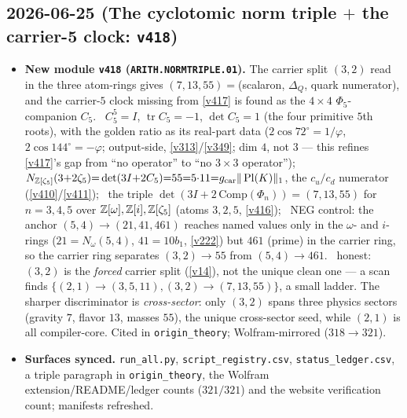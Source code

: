 \subsection*{2026-06-25 (The cyclotomic norm triple $+$ the carrier-5 clock: \texttt{v418})}
\begin{itemize}
\item \textbf{New module \texttt{v418} (\texttt{ARITH.NORMTRIPLE.01}).} The carrier split $(3,2)$ read in
the three atom-rings gives $(7,13,55)=$(scalaron, $\Delta_Q$, quark numerator), and the carrier-$5$ clock
missing from \vref{v417} is found as the $4{\times}4$ $\Phi_5$-companion $C_5$. \mE\ $C_5^5{=}I$,
$\operatorname{tr}C_5{=}{-}1$, $\det C_5{=}1$ (the four primitive $5$th roots), with the golden ratio as its
real-part data ($2\cos72^\circ{=}1/\varphi$, $2\cos144^\circ{=}{-}\varphi$; output-side, \vref{v313}/\vref{v349};
dim $4$, not $3$ --- this refines \vref{v417}'s gap from ``no operator'' to ``no $3{\times}3$ operator''); \mE\
$N_{\mathbb{Z}[\zeta_5]}(3{+}2\zeta_5){=}\det(3I{+}2C_5){=}55{=}5{\cdot}11{=}g_{\mathrm{car}}\|\operatorname{Pl}(K)\|_1$, the
$c_u/c_d$ numerator (\vref{v410}/\vref{v411}); \mE\ the triple $\det(3I{+}2\,\mathrm{Comp}(\Phi_n))=(7,13,55)$
for $n{=}3,4,5$ over $\mathbb{Z}[\omega],\mathbb{Z}[i],\mathbb{Z}[\zeta_5]$ (atoms $3,2,5$, \vref{v416}); \mE\ NEG control: the anchor
$(5,4)\to(21,41,461)$ reaches named values only in the $\omega$- and $i$-rings ($21{=}N_\omega(5,4)$,
$41{=}10b_1$, \vref{v222}) but $461$ (prime) in the carrier ring, so the carrier ring separates
$(3,2)\to55$ from $(5,4)\to461$. \mC\ honest: $(3,2)$ is the \emph{forced} carrier split (\vref{v14}), not the
unique clean one --- a scan finds $\{(2,1)\to(3,5,11),(3,2)\to(7,13,55)\}$, a small ladder. The sharper discriminator is
\emph{cross-sector}: only $(3,2)$ spans three physics sectors (gravity $7$, flavor $13$, masses $55$),
the unique cross-sector seed, while $(2,1)$ is all compiler-core. Cited in
\texttt{origin\_theory}; Wolfram-mirrored ($318\to321$).
\item \textbf{Surfaces synced.} \texttt{run\_all.py}, \texttt{script\_registry.csv},
\texttt{status\_ledger.csv}, a triple paragraph in \texttt{origin\_theory}, the Wolfram
extension/README/ledger counts ($321/321$) and the website verification count; manifests refreshed.
\end{itemize}

